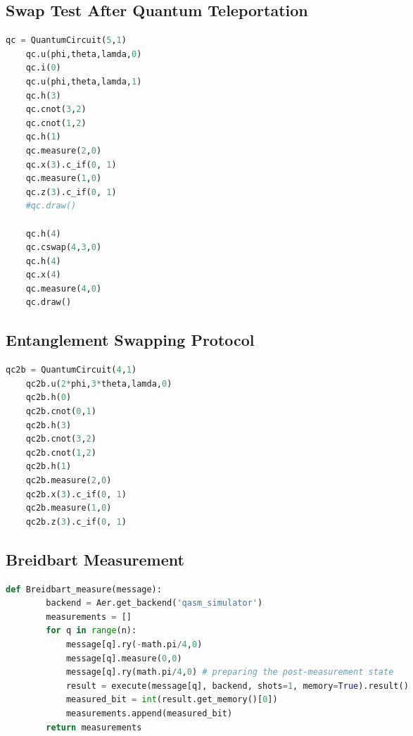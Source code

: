 \documentclass{article}
\begin{document}
\begin{CJK*}{UTF8}{bsmi}
\subsection{Swap Test After Quantum Teleportation}
 \begin{lstlisting}[language = Python]
    qc = QuantumCircuit(5,1)
    qc.u(phi,theta,lamda,0)
    qc.i(0)
    qc.u(phi,theta,lamda,1)
    qc.h(3)
    qc.cnot(3,2)
    qc.cnot(1,2)
    qc.h(1)
    qc.measure(2,0)
    qc.x(3).c_if(0, 1)
    qc.measure(1,0)
    qc.z(3).c_if(0, 1)
    #qc.draw()
    
    qc.h(4)
    qc.cswap(4,3,0)
    qc.h(4)
    qc.x(4)
    qc.measure(4,0)
    qc.draw()
\end{lstlisting}
\subsection{Entanglement Swapping Protocol}
 \begin{lstlisting}[language = Python]
    qc2b = QuantumCircuit(4,1)
    qc2b.u(2*phi,3*theta,lamda,0)
    qc2b.h(0)
    qc2b.cnot(0,1)
    qc2b.h(3)
    qc2b.cnot(3,2)
    qc2b.cnot(1,2)
    qc2b.h(1)
    qc2b.measure(2,0)
    qc2b.x(3).c_if(0, 1)
    qc2b.measure(1,0)
    qc2b.z(3).c_if(0, 1)
\end{lstlisting}
\subsection{Breidbart Measurement}
 \begin{lstlisting}[language = Python]
    def Breidbart_measure(message):
        backend = Aer.get_backend('qasm_simulator')
        measurements = []
        for q in range(n):
            message[q].ry(-math.pi/4,0)
            message[q].measure(0,0)
            message[q].ry(math.pi/4,0) # preparing the post-measurement state
            result = execute(message[q], backend, shots=1, memory=True).result() 
            measured_bit = int(result.get_memory()[0]) 
            measurements.append(measured_bit)
        return measurements
\end{lstlisting}

\end{CJK*}
\end{document}

